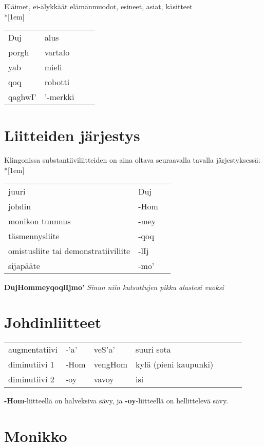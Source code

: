 \documentclass{book}
\begin{document}
Eläimet, ei-älykkäät elämänmuodot, esineet, asiat, käsitteet\\*[1em]
\begin{tabular}{Bl Il}
Duj & alus \\
porgh & vartalo \\
yab & mieli \\
qoq & robotti \\
qaghwI' & '-merkki \\
\end{tabular}

\section{Liitteiden järjestys}

Klingonissa substantiiviliitteiden on aina oltava seuraavalla tavalla järjestyksessä:\\*[1em]
\begin{tabular}{l Bl}
juuri & Duj \\
johdin & -Hom \\
monikon tunnnus & -mey \\
täsmennysliite & -qoq \\
omistusliite tai demonstratiiviliite & -lIj \\
sijapääte & -mo' \\
\end{tabular}

\textbf{DujHommeyqoqlIjmo'} \textit{Sinun niin kutsuttujen pikku alustesi vuoksi}

\section{Johdinliitteet}

\begin{tabular}{l Bl | Bl Il}
    augmentatiivi & -'a' & veS'a' & suuri sota \\
    diminutiivi 1 & -Hom & vengHom & kylä (pieni kaupunki) \\
    diminutiivi 2 & -oy & vavoy & isi \\
\end{tabular}

\textbf{-Hom}-liitteellä on halveksiva sävy, ja \textbf{-oy}-liitteellä on hellittelevä sävy.

\section{Monikko}
\end{document}
